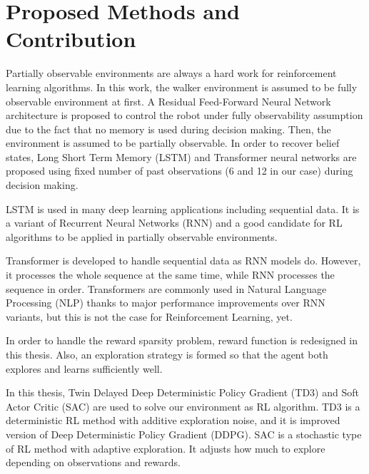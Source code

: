 \section{Proposed Methods and Contribution}
\label{sec:proposed_methods}

Partially observable environments are always a hard work for reinforcement learning algorithms. 
In this work, the walker environment is assumed to be fully observable environment at first. 
A Residual Feed-Forward Neural Network architecture is proposed to control 
the robot under fully observability assumption due to the fact that no memory is used during decision making. 
Then, the environment is assumed to be partially observable. 
In order to recover belief states, Long Short Term Memory (LSTM) and 
Transformer neural networks are proposed using fixed number of 
past observations (6 and 12 in our case) during decision making. 

LSTM is used in many deep learning applications including sequential data. 
It is a variant of Recurrent Neural Networks (RNN) and a good candidate for RL algorithms to be applied in partially observable environments. 

Transformer is developed to handle sequential data as RNN models do. 
However, it processes the whole sequence at the same time, while RNN processes the sequence in order. 
Transformers are commonly used in Natural Language Processing (NLP) thanks to major performance improvements over RNN variants, but this is not the case for Reinforcement Learning, yet.

In order to handle the reward sparsity problem, reward function is redesigned in this thesis. Also, an exploration strategy is formed so that the agent both explores and learns sufficiently well. 

In this thesis, Twin Delayed Deep Deterministic Policy Gradient (TD3) and Soft Actor Critic (SAC) are used to solve our environment as RL algorithm. 
TD3 is a deterministic RL method with additive exploration noise, and it is improved version of Deep Deterministic Policy Gradient (DDPG).
SAC is a stochastic type of RL method with adaptive exploration. 
It adjusts how much to explore depending on observations and rewards.

